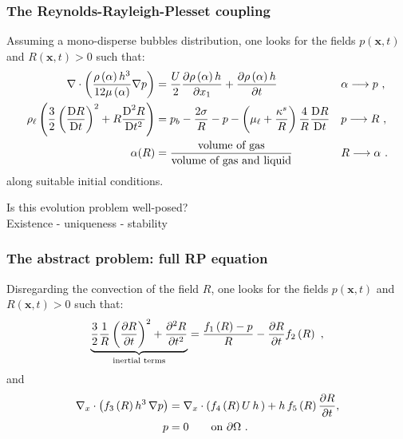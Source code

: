 \documentclass[10pt,aspectratio=169]{beamer}
\begin{document}
\begin{frame}
\frametitle{The Reynolds-Rayleigh-Plesset coupling}
Assuming a mono-disperse bubbles distribution, one looks for the fields $p(\mathbf{x},t)$ and $R(\mathbf{x},t)>0$ such that:
\begin{align*}
\nabla\cdot\left(\frac{\rho\left(\alpha\right) h^3}{12\mu\left(\alpha\right) }\nabla p \right)&=\frac{U}{2}\frac{\partial \rho\left(\alpha\right) h}{\partial x_1}+\frac{\partial \rho\left(\alpha\right) h}{\partial t}&&\alpha \longrightarrow p~,\\
\rho_\ell\left(\frac{3}{2}\left(\frac{\mbox{D} R}{\mbox{D} t}\right)^2+R\frac{\mbox{D}^2 R}{\mbox{D} {t}^2}\right)&=p_b-\frac{2\sigma}{R}-p-\left(\mu_\ell+\frac{\kappa^s}{R}\right)\frac{4}{R}\frac{\mbox{D} R}{\mbox{D} t}&&p\longrightarrow R~,\\
\alpha(R)&=\frac{\mbox{volume of gas}}{\mbox{volume of gas and liquid}}&&R\longrightarrow \alpha~.
\end{align*}
along suitable initial conditions.
\begin{center}
	Is this evolution problem  well-posed?\\
	Existence - uniqueness - stability
\end{center}
\end{frame} 


\begin{frame}
\frametitle{The abstract problem: full RP equation}
Disregarding the convection of the field $R$, one looks for the fields $p(\mathbf{x},t)$ and $R(\mathbf{x},t)>0$ such that:
\begin{equation}
\underbrace{\frac{3}{2}\frac{1}{R}\left(\frac{\partial R}{\partial t}\right)^2+\frac{\partial^2 R}{\partial t^2}}_{\textnormal{inertial terms}}=\frac{f_1\left(R\right)-p}{R}-\frac{\partial R}{\partial t}f_2\left(R\right)~,\label{eq:abstract-rp1}
\end{equation}
and
\begin{align}
\begin{split}
\nabla_x\cdot \left(f_3\left(R\right) h^3\,\nabla p\right)&=\nabla_x\cdot \left(f_4\left(R\right)U\,h\,\right)+h\,f_5\left(R\right)\frac{\partial R}{\partial t},\\
p&=0 \qquad\mbox{on } \partial \Omega~.
\end{split}
\label{eq:abstract-reynolds1}
\end{align}

\end{frame} 
\end{document}
